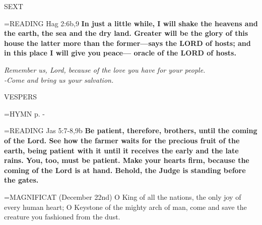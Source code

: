 \begin{flushleft}\normalsize SEXT\\\end{flushleft}

\hangindent=\parindent \small{\uppercase{READING}} Hag 2:6b,9 \textbf{In just a little while, I will shake the heavens and the earth, the sea and the dry land. Greater will be the glory of this house the latter more than the former—says the LORD of hosts; and in this place I will give you peace— oracle of the LORD of hosts.\\}

\begin{center}
\textit{Remember us, Lord, because of the love you have for your people.\\
-Come and bring us your salvation.}
\end{center}

\begin{flushleft}\normalsize VESPERS\\\end{flushleft}

\hangindent=\parindent \small{\uppercase{HYMN} p. \pageref{advent:firstHymn}-\pageref{advent:lastHymn}\\}

\hangindent=\parindent \small{\uppercase{READING}} Jas 5:7-8,9b \textbf{Be patient, therefore, brothers, until the coming of the Lord. See how the farmer waits for the precious fruit of the earth, being patient with it until it receives the early and the late rains. You, too, must be patient. Make your hearts firm, because the coming of the Lord is at hand. Behold, the Judge is standing before the gates.\\}

\hangindent=\parindent \small{MAGNIFICAT  (December 22nd) O King of all the nations, the only joy of every human heart; O Keystone of the mighty arch of man, come and save the creature you fashioned from the dust.\\}
